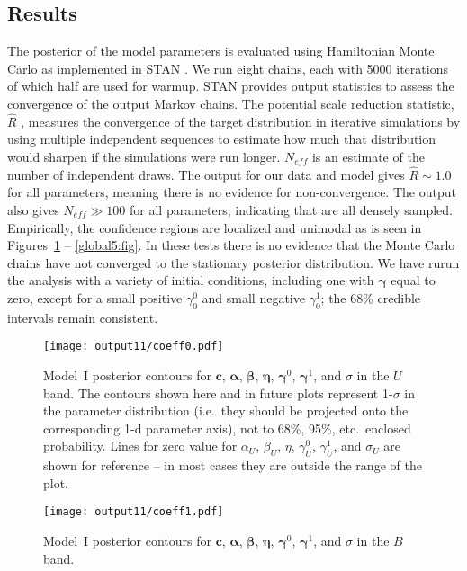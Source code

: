 \documentclass{aastex61}   	%
\begin{document}
\subsection{Results}
\label{results:sec}
The posterior of the model parameters is evaluated using Hamiltonian Monte Carlo as implemented in
STAN \citep{stan}.  We run eight chains, each with 5000 iterations of which
half are used for warmup.
STAN provides output statistics to assess
the convergence of the output Markov chains.
The 
potential scale reduction statistic, $\hat{R}$ \citep{Gelman92}, measures the convergence of the target distribution
in iterative simulations 
by using multiple independent sequences to estimate how much that distribution would sharpen if the simulations were run longer.
$N_{eff}$ is an estimate of the number of independent draws. The output for our data and model gives $\hat{R} \sim 1.0$ for all parameters, meaning there is no evidence for non-convergence.  The
output also gives  $N_{eff} \gg 100$ for all parameters, indicating that are all densely sampled.
Empirically, the confidence regions are localized and unimodal as is seen in  Figures~\ref{global1:fig} -- \ref{global5:fig}.  In these tests there is no evidence that
the Monte Carlo chains have not converged to the stationary posterior distribution.
We have rurun the analysis with a variety of initial conditions, including one with $\pmb{\gamma}$ equal to zero, except for a small positive 
$\gamma^0_0$ and small negative $\gamma^1_0$; the 68\% credible intervals
remain consistent.

\begin{figure}[htbp] %
   \centering
   \texttt{[image: output11/coeff0.pdf]} 
            \caption{Model~I posterior contours for $\mathbf{c}$, $\pmb{\alpha}$, $\pmb{\beta}$, $\pmb{\eta}$, $\pmb{\gamma}^0$, $\pmb{\gamma}^1$, and $\sigma$ in the $U$ band.
            The contours shown here and in future plots represent 1-$\sigma$ in the parameter distribution (i.e.\ they should be
            projected onto the corresponding 1-d parameter axis), not to 68\%, 95\%, etc.\
            enclosed probability.  Lines for zero value for $\alpha_U$, $\beta_U$, $\eta$, $\gamma_U^0$, $\gamma_U^1$, and $\sigma_U$ are shown for reference --
            in most cases they are outside the range of the plot.
            \label{global1:fig}}
\end{figure}

\begin{figure}[htbp] %
   \centering
   \texttt{[image: output11/coeff1.pdf]} 
            \caption{Model~I posterior contours for $\mathbf{c}$, $\pmb{\alpha}$, $\pmb{\beta}$, $\pmb{\eta}$,  $\pmb{\gamma}^0$, $\pmb{\gamma}^1$, and $\sigma$ in the $B$ band.
 \label{global2:fig}}
\end{figure}
\end{document}
